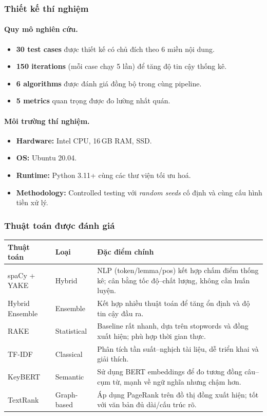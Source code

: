 \subsubsection{Thiết kế thí nghiệm}

\paragraph{Quy mô nghiên cứu.}
\begin{itemize}
  \item \textbf{30 test cases} được thiết kế có chủ đích theo 6 miền nội dung.
  \item \textbf{150 iterations} (mỗi case chạy 5 lần) để tăng độ tin cậy thống kê.
  \item \textbf{6 algorithms} được đánh giá đồng bộ trong cùng pipeline.
  \item \textbf{5 metrics} quan trọng được đo lường nhất quán.
\end{itemize}

\paragraph{Môi trường thí nghiệm.}
\begin{itemize}
  \item \textbf{Hardware:} Intel CPU, 16\,GB RAM, SSD.
  \item \textbf{OS:} Ubuntu 20.04.
  \item \textbf{Runtime:} Python 3.11+ cùng các thư viện tối ưu hoá.
  \item \textbf{Methodology:} Controlled testing với \textit{random seeds} cố định và cùng cấu hình tiền xử lý.
\end{itemize}

\subsubsection{Thuật toán được đánh giá}

\begin{table}[h]
\centering
\begin{tabular}{|l|l|p{8.6cm}|}
\hline
\textbf{Thuật toán} & \textbf{Loại} & \textbf{Đặc điểm chính} \\
\hline
spaCy + YAKE & Hybrid & NLP (token/lemma/pos) kết hợp chấm điểm thống kê; cân bằng tốc độ--chất lượng, không cần huấn luyện. \\
\hline
Hybrid Ensemble & Ensemble & Kết hợp nhiều thuật toán để tăng ổn định và độ tin cậy đầu ra. \\
\hline
RAKE & Statistical & Baseline rất nhanh, dựa trên stopwords và đồng xuất hiện; phù hợp thời gian thực. \\
\hline
TF-IDF & Classical & Phân tích tần suất--nghịch tài liệu, dễ triển khai và giải thích. \\
\hline
KeyBERT & Semantic & Sử dụng BERT embeddings để đo tương đồng câu--cụm từ, mạnh về ngữ nghĩa nhưng chậm hơn. \\
\hline
TextRank & Graph-based & Áp dụng PageRank trên đồ thị đồng xuất hiện; tốt với văn bản đủ dài/cấu trúc rõ. \\
\hline
\end{tabular}
\end{table}
\newpage

